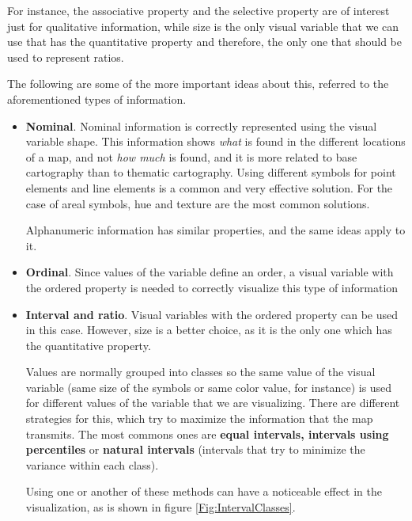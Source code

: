 For instance, the associative property and the selective property are of interest just for qualitative information, while size is the only visual variable that we can use that has the quantitative property and therefore, the only one that should be used to represent ratios.

The following are some of the more important ideas about this, referred to the aforementioned types of information.


\begin{itemize}
	
	\item \textbf{Nominal}. Nominal information is correctly represented using the visual variable shape. This information shows \emph{what} is found in the different locations of a map, and not \emph{how much} is found, and it is more related to base cartography than to thematic cartography. Using different symbols for point elements and line elements is a common and very effective solution. For the case of areal symbols, hue and texture are the most common solutions.

	Alphanumeric information has similar properties, and the same ideas apply to it.
	
	\item \textbf{Ordinal}. Since values of the variable define an order, a visual variable with the ordered property is needed to correctly visualize this type of information
	
	\item \textbf{Interval and ratio}. Visual variables with the ordered property can be used in this case. However, size is a better choice, as it is the only one which has the quantitative property.

	Values are normally grouped into classes so the same value of the visual variable (same size of the symbols or same color value, for instance) is used for different values of the variable that we are visualizing. There are different strategies for this, which try to maximize the information that the map transmits. The most commons ones are \textbf{equal intervals, intervals using percentiles} or \textbf{natural intervals} (intervals that try to minimize the variance within each class).

	Using one or another of these methods can have a noticeable effect in the visualization, as is shown in figure  \ref{Fig:IntervalClasses}.


\end{itemize}
